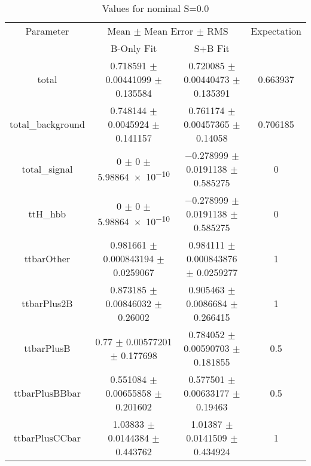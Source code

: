 \begin{table}
\centering
\caption{Values for nominal S=0.0}
\begin{tabular}{cccc}
\toprule
Parameter & \multicolumn{2}{c}{Mean $\pm$ Mean Error $\pm$ RMS} & Expectation\\
 & B-Only Fit & S+B Fit & \\
\midrule
total & \num{0.718591} $\pm$ \num{0.00441099} $\pm$ \num{0.135584} & \num{0.720085} $\pm$ \num{0.00440473} $\pm$ \num{0.135391} & \num{0.663937}\\
total\_background & \num{0.748144} $\pm$ \num{0.0045924} $\pm$ \num{0.141157} & \num{0.761174} $\pm$ \num{0.00457365} $\pm$ \num{0.14058} & \num{0.706185}\\
total\_signal & \num{0} $\pm$ \num{0} $\pm$ \num{5.98864e-10} & \num{-0.278999} $\pm$ \num{0.0191138} $\pm$ \num{0.585275} & \num{0}\\
ttH\_hbb & \num{0} $\pm$ \num{0} $\pm$ \num{5.98864e-10} & \num{-0.278999} $\pm$ \num{0.0191138} $\pm$ \num{0.585275} & \num{0}\\
ttbarOther & \num{0.981661} $\pm$ \num{0.000843194} $\pm$ \num{0.0259067} & \num{0.984111} $\pm$ \num{0.000843876} $\pm$ \num{0.0259277} & \num{1}\\
ttbarPlus2B & \num{0.873185} $\pm$ \num{0.00846032} $\pm$ \num{0.26002} & \num{0.905463} $\pm$ \num{0.0086684} $\pm$ \num{0.266415} & \num{1}\\
ttbarPlusB & \num{0.77} $\pm$ \num{0.00577201} $\pm$ \num{0.177698} & \num{0.784052} $\pm$ \num{0.00590703} $\pm$ \num{0.181855} & \num{0.5}\\
ttbarPlusBBbar & \num{0.551084} $\pm$ \num{0.00655858} $\pm$ \num{0.201602} & \num{0.577501} $\pm$ \num{0.00633177} $\pm$ \num{0.19463} & \num{0.5}\\
ttbarPlusCCbar & \num{1.03833} $\pm$ \num{0.0144384} $\pm$ \num{0.443762} & \num{1.01387} $\pm$ \num{0.0141509} $\pm$ \num{0.434924} & \num{1}\\
\bottomrule
\end{tabular}
\end{table}